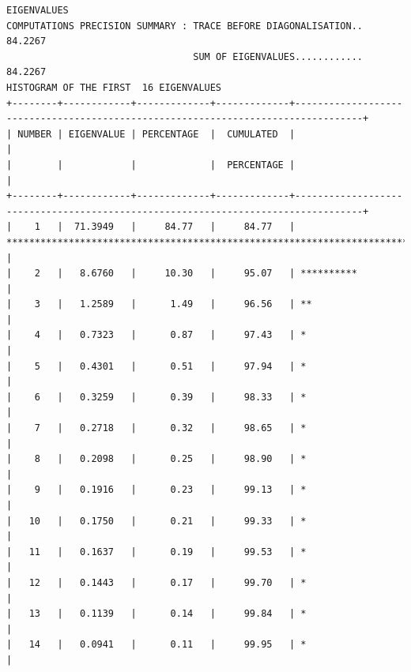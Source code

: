 \documentclass[a4paper,10pt,twocolumn]{article}
\begin{document}
\begin{landscape}
\begin{verbatim}
EIGENVALUES
COMPUTATIONS PRECISION SUMMARY : TRACE BEFORE DIAGONALISATION..  84.2267
                                 SUM OF EIGENVALUES............  84.2267
HISTOGRAM OF THE FIRST  16 EIGENVALUES
+--------+------------+-------------+-------------+----------------------------------------------------------------------------------+
| NUMBER | EIGENVALUE | PERCENTAGE  |  CUMULATED  |                                                                                  |
|        |            |             |  PERCENTAGE |                                                                                  |
+--------+------------+-------------+-------------+----------------------------------------------------------------------------------+
|    1   |  71.3949   |     84.77   |     84.77   | ******************************************************************************** |
|    2   |   8.6760   |     10.30   |     95.07   | **********                                                                       |
|    3   |   1.2589   |      1.49   |     96.56   | **                                                                               |
|    4   |   0.7323   |      0.87   |     97.43   | *                                                                                |
|    5   |   0.4301   |      0.51   |     97.94   | *                                                                                |
|    6   |   0.3259   |      0.39   |     98.33   | *                                                                                |
|    7   |   0.2718   |      0.32   |     98.65   | *                                                                                |
|    8   |   0.2098   |      0.25   |     98.90   | *                                                                                |
|    9   |   0.1916   |      0.23   |     99.13   | *                                                                                |
|   10   |   0.1750   |      0.21   |     99.33   | *                                                                                |
|   11   |   0.1637   |      0.19   |     99.53   | *                                                                                |
|   12   |   0.1443   |      0.17   |     99.70   | *                                                                                |
|   13   |   0.1139   |      0.14   |     99.84   | *                                                                                |
|   14   |   0.0941   |      0.11   |     99.95   | *                                                                                |

\end{verbatim}
\end{landscape}
\end{document}
